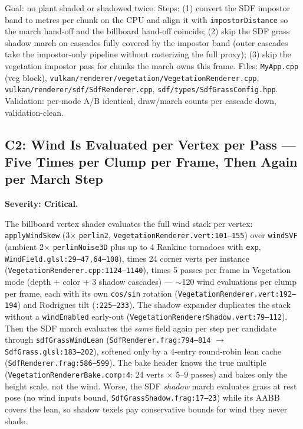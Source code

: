 \documentclass[11pt,a4paper]{article}
\begin{document}
\begin{tcolorbox}[promptbox={Prompt --- C1: unified grass LOD ladder, single shadow}]
Goal: no plant shaded or shadowed twice. Steps: (1) convert the SDF
impostor band to metres per chunk on the CPU and align it with
\texttt{impostorDistance} so the march hand-off and the billboard hand-off
coincide; (2) skip the SDF grass shadow march on cascades fully covered by
the impostor band (outer cascades take the impostor-only pipeline without
rasterizing the full proxy); (3) skip the vegetation impostor pass for
chunks the march owns this frame. Files: \texttt{MyApp.cpp} (veg block),
\texttt{vulkan/renderer/vegetation/VegetationRenderer.cpp},
\texttt{vulkan/renderer/sdf/SdfRenderer.cpp},
\texttt{sdf/types/SdfGrassConfig.hpp}. Validation: per-mode A/B identical,
draw/march counts per cascade down, validation-clean.
\end{tcolorbox}

\subsection{C2: Wind Is Evaluated per Vertex per Pass --- Five Times per Clump per Frame, Then Again per March Step}
\label{sec:c2}

\textbf{Severity: Critical.}

The billboard vertex shader evaluates the full wind stack per vertex:
\texttt{applyWindSkew} (3$\times$ \texttt{perlin2},
\texttt{VegetationRenderer.vert:101--155}) over \texttt{windSVF} (ambient
2$\times$ \texttt{perlinNoise3D} plus up to 4 Rankine tornadoes with
\texttt{exp}, \texttt{WindField.glsl:29--47,64--108}), times 24 corner verts
per instance (\texttt{VegetationRenderer.cpp:1124--1140}), times 5 passes per
frame in Vegetation mode (depth + color + 3 shadow cascades) --- $\sim$120
wind evaluations per clump per frame, each with its own \texttt{cos/sin}
rotation (\texttt{VegetationRenderer.vert:192--194}) and Rodrigues tilt
(\texttt{:225--233}). The shadow expander duplicates the stack without a
\texttt{windEnabled} early-out (\texttt{VegetationRendererShadow.vert:79--112}).
Then the SDF march evaluates the \emph{same} field again per step per
candidate through \texttt{sdfGrassWindLean}
(\texttt{SdfRenderer.frag:794--814} $\rightarrow$
\texttt{SdfGrass.glsl:183--202}), softened only by a 4-entry round-robin
lean cache (\texttt{SdfRenderer.frag:586--599}). The bake header knows the
true multiple (\texttt{VegetationRendererBake.comp:4}: 24 verts
$\times$ 5--9 passes) and bakes only the height scale, not the wind. Worse,
the SDF \emph{shadow} march evaluates grass at rest pose (no wind inputs
bound, \texttt{SdfGrassShadow.frag:17--23}) while its AABB covers the lean,
so shadow texels pay conservative bounds for wind they never shade.
\end{document}
